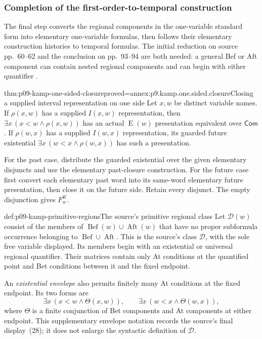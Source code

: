 
\subsubsection{Completion of the first-order-to-temporal construction}
\label{sec:p09-kamp-iii2-completion}

The final step converts the regional components in the one-variable
standard form into elementary one-variable formulas, then follows their
elementary construction histories to temporal formulas. The initial
reduction on source pp.~60--62 and the conclusion on pp.~93--94 are
both needed: a general Bef or Aft component can contain nested regional
components and can begin with either quantifier
\cite[ch.~III, pp.~60--62, 93--94]{Kamp1968}.

\begin{hblemma}{thm:p09-kamp-one-sided-closure}{proved=annex:p9.kamp.one.sided.closure}{Closing a supplied interval representation on one side}
Let \(x,w\) be distinct variable names.
If \(\rho(x,w)\) has a supplied \(I(x,w)\) representation,
then \(\exists x\,(x<w\land\rho(x,w))\) has an actual
\(\operatorname{E}(w)\) presentation equivalent over
\(\mathsf{Com}\). If \(\rho(w,x)\) has a supplied
\(I(w,x)\) representation, its guarded future existential
\(\exists x\,(w<x\land\rho(w,x))\) has such a presentation.

For the past case, distribute the guarded existential over the given
elementary disjuncts and use the elementary past-closure construction.
For the future case first convert each elementary past word into its
same-word elementary future presentation, then close it on the future
side. Retain every disjunct. The empty disjunction gives \(F^K_w\).
\end{hblemma}

\begin{hbdefinition}{def:p09-kamp-primitive-regions}{The source's primitive regional class}
Let \(\mathcal D(w)\) consist of the members of
\(\operatorname{Bef}(w)\cup\operatorname{Aft}(w)\) that have
no proper subformula occurrence belonging to
\(\operatorname{Bef}\cup\operatorname{Aft}\). This is the
source's class \(\mathcal D\), with the sole free variable
displayed. Its members begin with an existential or universal regional
quantifier. Their matrices contain only At conditions at the quantified
point and Bet conditions between it and the fixed endpoint.

An \emph{existential envelope} also permits finitely many At conditions
at the fixed endpoint. Its two forms are
\[
 \exists x\,(x<w\land\Theta(x,w)),\qquad
 \exists x\,(w<x\land\Theta(w,x)),
\]
where \(\Theta\) is a finite conjunction of Bet components and
At components at either endpoint. This supplementary envelope notation
records the source's final display~(28); it does not enlarge the
syntactic definition of \(\mathcal D\).
\end{hbdefinition}

